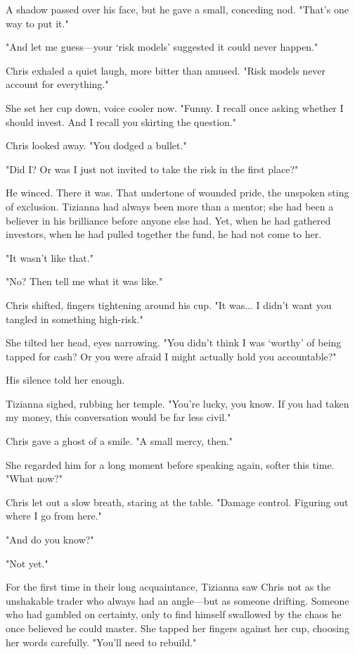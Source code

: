 A shadow passed over his face, but he gave a small, conceding nod. "That’s one way to put it."

"And let me guess—your ‘risk models’ suggested it could never happen."

Chris exhaled a quiet laugh, more bitter than amused. "Risk models never account for everything."

She set her cup down, voice cooler now. "Funny. I recall once asking whether I should invest. And I recall you skirting the question."

Chris looked away. "You dodged a bullet."

"Did I? Or was I just not invited to take the risk in the first place?"

He winced. There it was. That undertone of wounded pride, the unspoken sting of exclusion. Tizianna had always been more than a mentor; she had been a believer in his brilliance before anyone else had. Yet, when he had gathered investors, when he had pulled together the fund, he had not come to her.

"It wasn’t like that."

"No? Then tell me what it was like."

Chris shifted, fingers tightening around his cup. "It was... I didn’t want you tangled in something high-risk."

She tilted her head, eyes narrowing. "You didn’t think I was ‘worthy’ of being tapped for cash? Or you were afraid I might actually hold you accountable?"

His silence told her enough.

Tizianna sighed, rubbing her temple. "You’re lucky, you know. If you had taken my money, this conversation would be far less civil."

Chris gave a ghost of a smile. "A small mercy, then."

She regarded him for a long moment before speaking again, softer this time. "What now?"

Chris let out a slow breath, staring at the table. "Damage control. Figuring out where I go from here."

"And do you know?"

"Not yet."

For the first time in their long acquaintance, Tizianna saw Chris not as the unshakable trader who always had an angle—but as someone drifting. Someone who had gambled on certainty, only to find himself swallowed by the chaos he once believed he could master. She tapped her fingers against her cup, choosing her words carefully. "You’ll need to rebuild."

